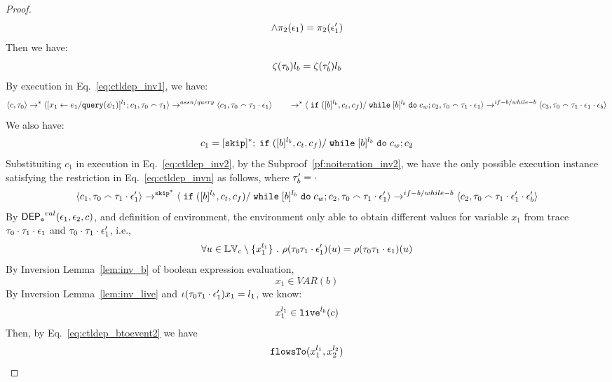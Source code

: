 \begin{proof}
\[\land 
\pi_2(\mathtt{\epsilon}_1) = \pi_2(\mathtt{\epsilon}_1')
\]
%
Then we have:
 \begin{equation}
\label{eq:ctldep_invn}
  \mathtt{\zeta}(\mathtt{\tau}_b) l_b = \mathtt{\zeta}(\mathtt{\tau}_b') l_b
\end{equation}
 By execution in Eq.~\ref{eq:ctldep_inv1}, we have:
\[
\langle {c}, \mathtt{\tau}_0 \rangle \rightarrow^{*} 
\langle [\mathrel{ {x}_1 \leftarrow e_1 / {\tt query}(\psi_1) }]^{l_1} ; {c}_1, \mathtt{\tau}_0 \smallfrown \mathtt{\tau}_1 \rangle  
\rightarrow^{assn/query}
 \langle c_1, \mathtt{\tau}_0 \smallfrown \mathtt{\tau}_1 \cdot \mathtt{\epsilon}_1 \rangle 
 \\ \qquad 
 \rightarrow^{*} 
  \langle \;\mathtt{if}\;([b]{}^{l_b}, c_t, c_f) / \;\mathtt{while}\; [b]{}^{l_b} \;\mathtt{do}\; c_w; {c}_2, 
  \mathtt{\tau}_0 \smallfrown \mathtt{\tau}_1 \cdot \mathtt{\epsilon}_1 \rangle 
  \rightarrow^{if-b / while-b} 
  \langle {c}_3,  \mathtt{\tau}_0 \smallfrown \mathtt{\tau}_1 \cdot \mathtt{\epsilon}_1 \cdot \mathtt{\epsilon}_b \rangle 
 \]
 We also have:
 \[
 c_1 = [\mathtt{skip}]^*;\;\mathtt{if}\;([b]{}^{l_b}, c_t, c_f) / \;\mathtt{while}\; [b]{}^{l_b} \;\mathtt{do}\; c_w; {c}_2
 \]
Substituiting $c_1$ in execution in Eq.~\ref{eq:ctldep_inv2}, by the Subproof~\ref{pf:noiteration_inv2}, 
we have the only possible execution instance satisfying 
the restriction in Eq.~\ref{eq:ctldep_invn} as follows, where $\mathtt{\tau}_b' = \cdot$
%
 \[
  \langle c_1, \mathtt{\tau}_0 \smallfrown \mathtt{\tau}_1 \cdot \mathtt{\epsilon}_1' \rangle 
  \rightarrow^{\mathtt{skip}^*} 
  \langle 
  \;\mathtt{if}\;([b]{}^{l_b}, c_t, c_f) / \;\mathtt{while}\; [b]{}^{l_b} \;\mathtt{do}\; c_w; {c}_2, 
  \mathtt{\tau}_0 \smallfrown \mathtt{\tau}_1 \cdot \mathtt{\epsilon}_1' \rangle 
  \rightarrow^{if-b / while-b} 
  \langle {c}_2,  \mathtt{\tau}_0 \smallfrown \mathtt{\tau}_1 \cdot \mathtt{\epsilon}_1' \cdot \mathtt{\epsilon}_b' \rangle 
 \]
By $\mathsf{DEP_{\mathtt{e}}}^{val}(\mathtt{\epsilon}_1, \mathtt{\epsilon}_2, c)$, and definition of environment, 
the environment only able to obtain different values for variable $x_1$ 
from trace $\mathtt{\tau}_0 \cdot \mathtt{\tau}_1 \cdot \mathtt{\epsilon}_1$ and 
$\mathtt{\tau}_0 \cdot \mathtt{\tau}_1 \cdot \mathtt{\epsilon}_1'$, i.e.,
\[
  \forall u \in \mathbb{LV}_c \setminus \{x_1^{l_1}\} ~.~
  \rho(\mathtt{\tau}_0 \mathtt{\tau}_1 \cdot \mathtt{\epsilon}_1') (u) =  
  \rho(\mathtt{\tau}_0 \mathtt{\tau}_1 \cdot \mathtt{\epsilon}_1) (u)
\]
%
By {Inversion Lemma~\ref{lem:inv_b}} of boolean expression evaluation,
 \[
  x_1 \in VAR(b)
 \]
 By Inversion Lemma~\ref{lem:inv_live} and $\iota(\mathtt{\tau}_0 \mathtt{\tau}_1 \cdot \mathtt{\epsilon}_1') x_1 = l_1$, we know:
\[
  x_1^{l_1} \in \mathtt{live}^{l_b}(c)
\]
 Then, by Eq.~\ref{eq:ctldep_btoevent2} we have
 \[
 \mathtt{flowsTo}(x_1^{l_1}, x_2^{l_2})
\]
\end{proof}

